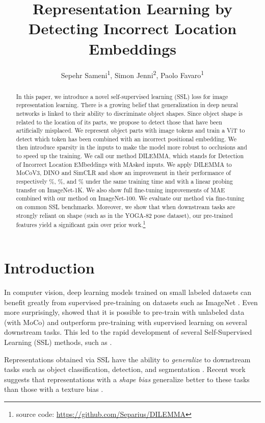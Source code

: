 \documentclass[letterpaper]{article} \usepackage{aaai23}  \usepackage{times}  \usepackage{helvet}  \usepackage{courier}  \usepackage[hyphens]{url}  \usepackage{graphicx} \urlstyle{rm} \def\UrlFont{\rm}  \usepackage{natbib}  \usepackage{caption} \frenchspacing  \setlength{\pdfpagewidth}{8.5in}  \setlength{\pdfpageheight}{11in}  \usepackage{algorithm}
\title{Representation Learning by Detecting Incorrect Location Embeddings}
\author {
    Sepehr Sameni\textsuperscript{\rm 1},
    Simon Jenni\textsuperscript{\rm 2},
    Paolo Favaro\textsuperscript{\rm 1}
}
\newcommand{\methodname}{DILEMMA}
\newcommand{\methodnameexpansion}{Detection of Incorrect Location EMbeddings with MAsked inputs}
\begin{document}
\maketitle

\begin{abstract}
In this paper, we introduce a novel self-supervised learning (SSL) loss for image representation learning. There is a growing belief that generalization in deep neural networks is linked to their ability to discriminate object shapes. Since object shape is related to the location of its parts, we propose to detect those that have been artificially misplaced. We represent object parts with image tokens and train a ViT to detect which token has been combined with an incorrect positional embedding. We then introduce sparsity in the inputs to make the model more robust to occlusions and to speed up the training. We call our method \methodname, which stands for \methodnameexpansion. We apply {\methodname} to MoCoV3, DINO and SimCLR and show an improvement in their performance of respectively \%, \%, and \% under the same training time and with a linear probing transfer on ImageNet-1K. We also show full fine-tuning improvements of MAE combined with our method on ImageNet-100. We evaluate our method via fine-tuning on common SSL benchmarks. Moreover, we show that when downstream tasks are strongly reliant on shape (such as in the YOGA-82 pose dataset), our pre-trained features yield a significant gain over prior work.\footnote{source code: \url{https://github.com/Separius/DILEMMA}}

\end{abstract}

\section{Introduction}

In computer vision, deep learning models trained on small labeled datasets can benefit greatly from supervised pre-training on datasets such as ImageNet \cite{girshick2014rich}. Even more surprisingly, \cite{he2020momentum} showed that it is possible to pre-train with unlabeled data (with MoCo) and outperform pre-training with supervised learning on several downstream tasks. This led to the rapid development of several Self-Supervised Learning (SSL) methods, such as \cite{caron2020unsupervised,chen2020simple,chen2020improved,he2020momentum}.

Representations obtained via SSL have the ability to \emph{generalize} to downstream tasks such as object classification, detection, and segmentation \cite{deng2009imagenet,Everingham2009ThePV,Krizhevsky2009LearningML}. Recent work suggests that representations with a \emph{shape bias} generalize better to these tasks than those with a texture bias \cite{geirhos2018imagenet,tartaglini2022developmentally}.
\end{document}
